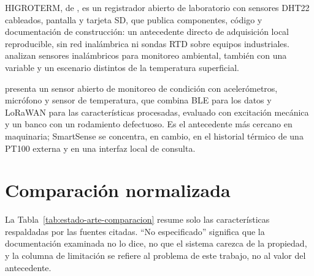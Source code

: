 HIGROTERM, de \citet{higroterm2021}, es un registrador abierto de laboratorio con sensores DHT22 cableados, pantalla y tarjeta SD, que publica componentes, código y documentación de construcción: un antecedente directo de adquisición local reproducible, sin red inalámbrica ni sondas RTD sobre equipos industriales. \citet{mois2017} analizan sensores inalámbricos para monitoreo ambiental, también con una variable y un escenario distintos de la temperatura superficial.

\citet{jakobsen2024} presenta un sensor abierto de monitoreo de condición con acelerómetros, micrófono y sensor de temperatura, que combina BLE para los datos y LoRaWAN para las características procesadas, evaluado con excitación mecánica y un banco con un rodamiento defectuoso. Es el antecedente más cercano en maquinaria; SmartSense se concentra, en cambio, en el historial térmico de una PT100 externa y en una interfaz local de consulta.

\section{Comparación normalizada}
La Tabla~\ref{tab:estado-arte-comparacion} resume solo las características respaldadas por las fuentes citadas. ``No especificado'' significa que la documentación examinada no lo dice, no que el sistema carezca de la propiedad, y la columna de limitación se refiere al problema de este trabajo, no al valor del antecedente.

